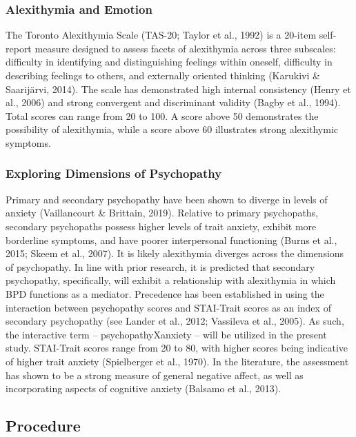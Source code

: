 \documentclass[
  man,floatsintext]{apa7}
\begin{document}
\hypertarget{alexithymia-and-emotion}{%
\subsubsection{Alexithymia and Emotion}\label{alexithymia-and-emotion}}

The Toronto Alexithymia Scale (TAS-20; Taylor et al., 1992) is a 20-item self-report measure designed to assess facets of alexithymia across three subscales: difficulty in identifying and distinguishing feelings within oneself, difficulty in describing feelings to others, and externally oriented thinking (Karukivi \& Saarijärvi, 2014). The scale has demonstrated high internal consistency (Henry et al., 2006) and strong convergent and discriminant validity (Bagby et al., 1994). Total scores can range from 20 to 100. A score above 50 demonstrates the possibility of alexithymia, while a score above 60 illustrates strong alexithymic symptoms.

\hypertarget{exploring-dimensions-of-psychopathy}{%
\subsubsection{Exploring Dimensions of Psychopathy}\label{exploring-dimensions-of-psychopathy}}

Primary and secondary psychopathy have been shown to diverge in levels of anxiety (Vaillancourt \& Brittain, 2019). Relative to primary psychopaths, secondary psychopaths possess higher levels of trait anxiety, exhibit more borderline symptoms, and have poorer interpersonal functioning (Burns et al., 2015; Skeem et al., 2007). It is likely alexithymia diverges across the dimensions of psychopathy. In line with prior research, it is predicted that secondary psychopathy, specifically, will exhibit a relationship with alexithymia in which BPD functions as a mediator. Precedence has been established in using the interaction between psychopathy scores and STAI-Trait scores as an index of secondary psychopathy (see Lander et al., 2012; Vassileva et al., 2005). As such, the interactive term -- psychopathyXanxiety -- will be utilized in the present study. STAI-Trait scores range from 20 to 80, with higher scores being indicative of higher trait anxiety (Spielberger et al., 1970). In the literature, the assessment has shown to be a strong measure of general negative affect, as well as incorporating aspects of cognitive anxiety (Balsamo et al., 2013).

\hypertarget{procedure}{%
\subsection{Procedure}\label{procedure}}
\end{document}
